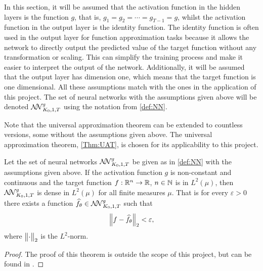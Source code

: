 In this section, it will be assumed that the activation function in the hidden layers is the function $g$, that is, $g_1 = g_2 = \cdots = g_{T-1} = g$, whilst the activation function in the output layer is the identity function. The identity function is often used in the output layer for function approximation tasks because it allows the network to directly output the predicted value of the target function without any transformation or scaling. This can simplify the training process and make it easier to interpret the output of the network. Additionally, it will be assumed that the output layer has dimension one, which means that the target function is one dimensional. All these assumptions match with the ones in the application of this project. The set of neural networks with the assumptions given above will be denoted $\mathcal{N\mkern-5mu N}^g_{K_0, 1, T}$ using the notation from \autoref{def:NN}. 

Note that the universal approximation theorem can be extended to countless versions, some without the assumptions given above. The universal approximation theorem, \autoref{Thm:UAT}, is chosen for its applicability to this project. 
\begin{thm} \label{Thm:UAT}
    Let the set of neural networks $\mathcal{N\mkern-5mu N}^g_{K_0, 1, T}$ be given as in \autoref{def:NN} with the assumptions given above. If the activation function $g$ is non-constant and continuous and the target function $f:\R^n \to \R$, $n\in \N$ is in $L^2(\mu)$, then $\mathcal{N\mkern-5mu N}^g_{K_0, 1, T}$ is dense in $L^2(\mu)$ for all finite measures $\mu$. That is for every $\varepsilon > 0$ there exists a function $\hat{f}_{\theta} \in \mathcal{N\mkern-5mu N}^g_{K_0, 1, T}$ such that
    \begin{align*}
        \norm{f - \hat{f}_{\theta}}_2 < \varepsilon, 
    \end{align*}
    where $\norm{\cdot}_2$ is the $L^2$-norm.
\end{thm}
\begin{proof}
    The proof of this theorem is outside the scope of this project, but can be found in \citep{Hornik}.
\end{proof}


